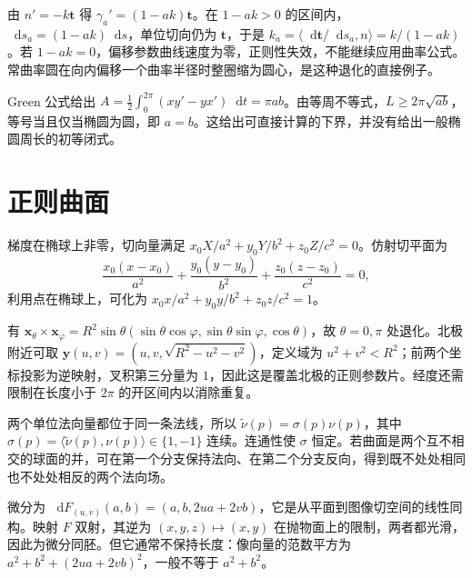 \documentclass[UTF8,12pt,a4paper,fontset=fandol]{ctexbook}
\newcommand{\dd}{\mathop{}\!\mathrm d}
\newcommand{\ip}[2]{\langle #1,#2\rangle}
\begin{document}
\begin{solve}
由 $n'=-k\mathbf t$ 得 $\gamma_a'=(1-ak)\mathbf t$。在 $1-ak>0$ 的区间内，$\dd s_a=(1-ak)\dd s$，单位切向仍为 $\mathbf t$，于是 $k_a=\ip{\dd\mathbf t/\dd s_a}n=k/(1-ak)$。若 $1-ak=0$，偏移参数曲线速度为零，正则性失效，不能继续应用曲率公式。常曲率圆在向内偏移一个曲率半径时整圈缩为圆心，是这种退化的直接例子。
\end{solve}

\begin{solve}
Green 公式给出 $A=\frac12\int_0^{2\pi}(xy'-yx')\dd t=\pi ab$。由等周不等式，$L\ge2\pi\sqrt{ab}$，等号当且仅当椭圆为圆，即 $a=b$。这给出可直接计算的下界，并没有给出一般椭圆周长的初等闭式。
\end{solve}

\section{正则曲面}
\begin{solve}
梯度在椭球上非零，切向量满足 $x_0X/a^2+y_0Y/b^2+z_0Z/c^2=0$。仿射切平面为
\[
 \frac{x_0(x-x_0)}{a^2}+\frac{y_0(y-y_0)}{b^2}
 +\frac{z_0(z-z_0)}{c^2}=0,
\]
利用点在椭球上，可化为 $x_0x/a^2+y_0y/b^2+z_0z/c^2=1$。
\end{solve}

\begin{solve}
有 $\mathbf x_\theta\times\mathbf x_\varphi=R^2\sin\theta(\sin\theta\cos\varphi,\sin\theta\sin\varphi,\cos\theta)$，故 $\theta=0,\pi$ 处退化。北极附近可取 $\mathbf y(u,v)=(u,v,\sqrt{R^2-u^2-v^2})$，定义域为 $u^2+v^2<R^2$；前两个坐标投影为逆映射，叉积第三分量为 $1$，因此这是覆盖北极的正则参数片。经度还需限制在长度小于 $2\pi$ 的开区间内以消除重复。
\end{solve}

\begin{solve}
两个单位法向量都位于同一条法线，所以 $\widetilde\nu(p)=\sigma(p)\nu(p)$，其中 $\sigma(p)=\ip{\widetilde\nu(p)}{\nu(p)}\in\{1,-1\}$ 连续。连通性使 $\sigma$ 恒定。若曲面是两个互不相交的球面的并，可在第一个分支保持法向、在第二个分支反向，得到既不处处相同也不处处相反的两个法向场。
\end{solve}

\begin{solve}
微分为 $\dd F_{(u,v)}(a,b)=(a,b,2ua+2vb)$，它是从平面到图像切空间的线性同构。映射 $F$ 双射，其逆为 $(x,y,z)\mapsto(x,y)$ 在抛物面上的限制，两者都光滑，因此为微分同胚。但它通常不保持长度：像向量的范数平方为 $a^2+b^2+(2ua+2vb)^2$，一般不等于 $a^2+b^2$。
\end{solve}
\end{document}

